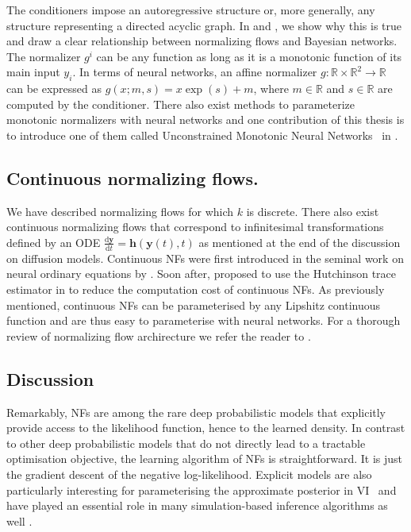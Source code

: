 The conditioners impose an autoregressive structure or, more generally, any structure representing a directed acyclic graph. In  and , we show why this is true and draw a clear relationship between normalizing flows and Bayesian networks. The normalizer $g^i$ can be any function as long as it is a monotonic function of its main input $y_i$. In terms of neural networks, an affine normalizer $g: \mathbb{R} \times \mathbb{R}^2 \rightarrow \mathbb{R}$ can be expressed as
$g(x;m, s) = x\exp(s) + m$, where $m \in \mathbb{R}$ and $s \in \mathbb{R}$ are computed by the conditioner. There also exist methods to parameterize monotonic normalizers \citep{huang_neural_2018, de_cao_block_2020, durkan_neural_2019, jaini_sum--squares_2019} with neural networks and one contribution of this thesis is to introduce one of them called Unconstrained Monotonic Neural Networks~\citep[UMNNs, ][]{wehenkel_unconstrained_2019} in .


\subsection{Continuous normalizing flows.}
We have described normalizing flows for which $k$ is discrete. There also exist continuous normalizing flows that correspond to infinitesimal transformations defined by an ODE $\frac{\text{d} \bm{y} }{\text{d}t} = \bm{h}(\bm{y}(t), t)$ as mentioned at the end of the discussion on diffusion models. Continuous NFs were first introduced in the seminal work on neural ordinary equations by \citet[NODE,][]{chen_neural_2018}. Soon after, \citet{grathwohl_ffjord_2018} proposed to use the Hutchinson trace estimator in  to reduce the computation cost of continuous NFs. As previously mentioned, continuous NFs can be parameterised by any Lipshitz continuous function and are thus easy to parameterise with neural networks.
For a thorough review of normalizing flow archirecture we refer the reader to \citet{papamakarios_normalizing_2019, kobyzev_normalizing_2020} .

\subsection{Discussion}
Remarkably, NFs are among the rare deep probabilistic models that explicitly provide access to the likelihood function, hence to the learned density. In contrast to other deep probabilistic models that do not directly lead to a tractable optimisation objective, the learning algorithm of NFs is straightforward. It is just the gradient descent of the negative log-likelihood. Explicit models are also particularly interesting for parameterising the approximate posterior in VI~\citep{rezende2015variational} and have played an essential role in many simulation-based inference algorithms as well \citep{papamakarios_sequential_2019, greenberg_automatic_2019}.


